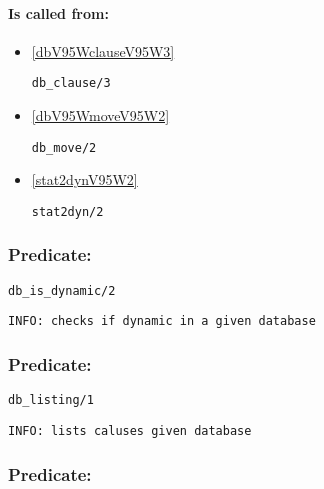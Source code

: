 \paragraph{Is called from:} 
\begin{itemize}
\item \ref{dbV95WclauseV95W3} 
\begin{verbatim}
db_clause/3
\end{verbatim}

\item \ref{dbV95WmoveV95W2} 
\begin{verbatim}
db_move/2
\end{verbatim}

\item \ref{stat2dynV95W2} 
\begin{verbatim}
stat2dyn/2
\end{verbatim}

\end{itemize}

\subsubsection{Predicate:} \label{dbV95WisV95WdynamicV95W2}

\begin{verbatim}
db_is_dynamic/2
\end{verbatim}

{\small \begin{verbatim}
INFO: checks if dynamic in a given database

\end{verbatim}}

\subsubsection{Predicate:} \label{dbV95WlistingV95W1}

\begin{verbatim}
db_listing/1
\end{verbatim}

{\small \begin{verbatim}
INFO: lists caluses given database

\end{verbatim}}

\subsubsection{Predicate:} \label{dbV95WlistingV95W2}

